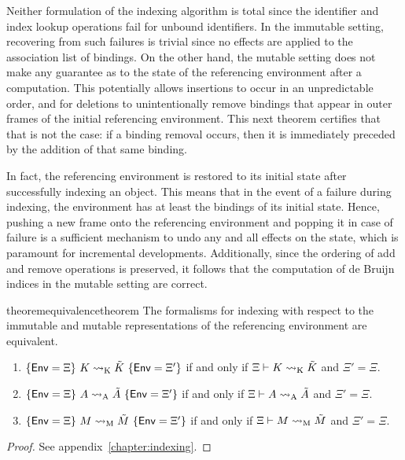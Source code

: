 Neither formulation of the indexing algorithm is total since the identifier and index lookup operations fail for unbound identifiers.
In the immutable setting, recovering from such failures is trivial since no effects are applied to the association list of bindings.
On the other hand, the mutable setting does not make any guarantee as to the state of the referencing environment after a computation.
This potentially allows insertions to occur in an unpredictable order, and for deletions to unintentionally remove bindings that appear in outer frames of the initial referencing environment.
This next theorem certifies that that is not the case: if a binding removal occurs, then it is immediately preceded by the addition of that same binding.

In fact, the referencing environment is restored to its initial state after successfully indexing an \LF object.
This means that in the event of a failure during indexing, the environment has at least the bindings of its initial state.
Hence, pushing a new frame onto the referencing environment and popping it in case of failure is a sufficient mechanism to undo any and all effects on the state, which is paramount for incremental developments.
Additionally, since the ordering of add and remove operations is preserved, it follows that the computation of de Bruijn indices in the mutable setting are correct.

\begin{restatable}[Equivalence]{theorem}{equivalencetheorem}\label{theorem:equivalence}
The formalisms for indexing with respect to the immutable and mutable representations of the referencing environment are equivalent.
\begin{enumerate}
\item $\{\mathsf{Env} = \Xi\}\ K \rightsquigarrow_{{\normalfont\text{K}}} \tilde K\ \{\mathsf{Env} = \Xi'\}$ if and only if $\Xi \vdash K \rightsquigarrow_{{\normalfont\text{K}}} \tilde K$ and $\Xi' = \Xi$.
\item $\{\mathsf{Env} = \Xi\}\ A \rightsquigarrow_{{\normalfont\text{A}}} \tilde A\ \{\mathsf{Env} = \Xi'\}$ if and only if $\Xi \vdash A \rightsquigarrow_{{\normalfont\text{A}}} \tilde A$ and $\Xi' = \Xi$.
\item $\{\mathsf{Env} = \Xi\}\ M \rightsquigarrow_{{\normalfont\text{M}}} \tilde M\ \{\mathsf{Env} = \Xi'\}$ if and only if $\Xi \vdash M \rightsquigarrow_{{\normalfont\text{M}}} \tilde M$ and $\Xi' = \Xi$.
\end{enumerate}
\end{restatable}

\begin{proof}
See appendix~\ref{chapter:indexing}.
\end{proof}

